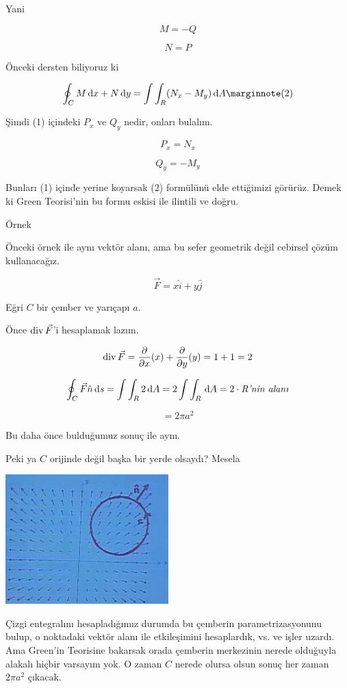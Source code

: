 \documentclass[12pt,fleqn]{article}\usepackage{../../common}
\begin{document}
Yani 

$$ M = -Q $$

$$ N = P $$

Önceki dersten biliyoruz ki 

$$
\oint_C M \ud x + N \ud y = \int \int_R (N_x - M_y) \ud A 
\mlabel{2}
$$

Şimdi (1) içindeki $P_x$ ve $Q_y$ nedir, onları bulalım. 

$$ P_x = N_x $$

$$ Q_y = -M_y $$

Bunları (1) içinde yerine koyarsak (2) formülünü elde ettiğimizi görürüz. Demek
ki Green Teorisi'nin bu formu eskisi ile ilintili ve doğru.

Örnek

Önceki örnek ile aynı vektör alanı, ama bu sefer geometrik değil cebirsel
çözüm kullanacağız. 

$$ \vec{F} = x\hat{i} + y\hat{j} $$

Eğri $C$ bir çember ve yarıçapı $a$. 

Önce $\operatorname{div} \vec{F}$'i hesaplamak lazım. 

$$ \operatorname{div} \vec{F}  = 
\frac{\partial }{\partial x}(x) + 
\frac{\partial }{\partial y}(y) = 
1 + 1 = 2 
 $$

$$
\oint_C \vec{F} \hat{n} \,\mathrm{d} s = 
\int \int_R 2 \,\mathrm{d} A = 2 \int \int_R \,\mathrm{d} A = 
2 \cdot \textit{R'nin alanı}
$$

$$ = 2\pi a^2 $$

Bu daha önce bulduğumuz sonuç ile aynı.

Peki ya $C$ orijinde değil başka bir yerde olsaydı? Mesela 

\begin{center}
\includegraphics[height=5cm]{23_9.png}
\end{center}
Çizgi entegralını hesapladığımız durumda bu çemberin parametrizasyonunu
bulup, o noktadaki vektör alanı ile etkileşimini hesaplardık, vs. ve işler
uzardı. Ama Green'in Teorisine bakarsak orada çemberin merkezinin nerede
olduğuyla alakalı hiçbir varsayım yok. O zaman $C$ nerede olursa olsun
sonuç her zaman $2\pi a^2$ çıkacak. 
\end{document}
